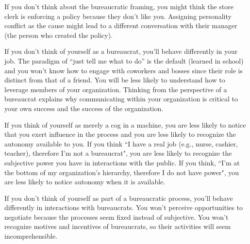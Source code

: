 If you don't think about the bureaucratic framing, you might think the store clerk is enforcing a policy because they don't like you. Assigning personality conflict as the cause might lead to a different conversation with their manager (the person who created the policy). 

If you don't think of yourself as a bureaucrat, you'll behave differently in your job. The paradigm of ``just tell me what to do'' is the default (learned in school) and you won't know how to engage with coworkers and bosses since their role is distinct from that of a friend. You will be less likely to understand how to leverage members of your organization. Thinking from the perspective of a bureaucrat explains why communicating within your organization is critical to your own success and the success of the organization. 

If you think of yourself as merely a cog in a machine, you are less likely to notice that you exert influence in the process and you are less likely to recognize the autonomy available to you. 
If you think ``I have a real job (e.g., nurse, cashier, teacher), therefore I'm not a bureaucrat", you are less likely to recognize the subjective power you have in interactions with the public.
If you think, ``I'm at the bottom of my organization's hierarchy, therefore I do not have power", you are less likely to notice autonomy when it is available.

If you don't think of yourself as part of a bureaucratic process, you'll behave differently in interactions with bureaucrats.  You won't perceive opportunities to negotiate because the processes seem fixed instead of subjective. 
You won't recognize motives and incentives of bureaucrats, so their activities will seem incomprehensible.



